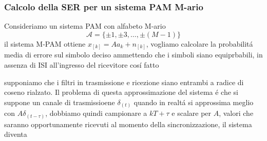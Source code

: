         \subsubsection{Calcolo della SER per un sistema PAM M-ario}
            Consideriamo un sistema PAM con alfabeto M-ario
            \[
                \mathcal{A} = \{\pm 1,\pm 3,\dots, \pm(M-1)\}  
            \]
            il sistema M-PAM ottiene $x_{[k]} = Aa_k + n_{[k]}$,
            vogliamo calcolare la probabilitá media di errore sul simbolo deciso ammettendo che i simboli 
            siano equiprbabili, in assenza di ISI all'ingresso del ricevitore cosí fatto
            \begin{figure}[H]
                \centering
            \end{figure}                    
            supponiamo che i filtri in trasmissione e ricezione siano entrambi a radice di coseno rialzato. Il problema di questa 
            approssimazione del sistema é che si suppone un canale di trasmissioene $\delta_{(t)}$ quando in realtá si approssima
            meglio con $A\delta_{(t-\tau)}$, dobbiamo quindi campionare a $kT+\tau$ e scalare per $A$, valori che saranno 
            opportunamente ricevuti al momento della sincronizzazione, il sistema diventa 
